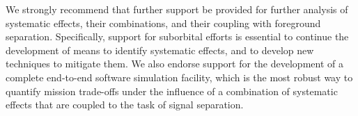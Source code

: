 \documentclass[PICOReport.tex]{subfiles}
\begin{document}
We strongly recommend that further support be provided for further analysis of systematic effects, their combinations, and their coupling with foreground separation. Specifically, support for suborbital efforts is essential to continue the development of means to identify systematic effects, and to develop new techniques to mitigate them. We also endorse support for the development of a complete end-to-end software simulation facility, which is the most robust way to quantify mission trade-offs under the influence of a combination of systematic effects that are coupled to the task of signal separation.  


\end{document}
